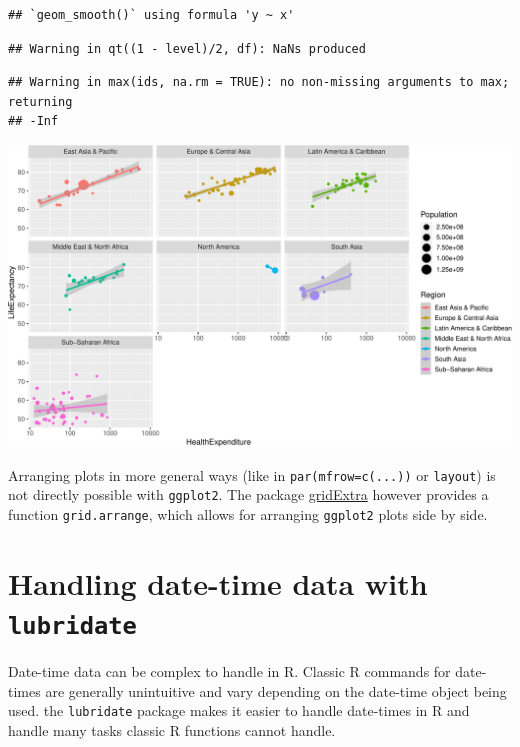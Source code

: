 \documentclass[
]{book}
\begin{document}
\begin{verbatim}
## `geom_smooth()` using formula 'y ~ x'
\end{verbatim}

\begin{verbatim}
## Warning in qt((1 - level)/2, df): NaNs produced
\end{verbatim}

\begin{verbatim}
## Warning in max(ids, na.rm = TRUE): no non-missing arguments to max; returning
## -Inf
\end{verbatim}

\includegraphics[width=\textwidth]{bookdown-demo_files/figure-latex/unnamed-chunk-65-1}

Arranging plots in more general ways (like in \texttt{par(mfrow=c(...))} or \texttt{layout}) is not directly possible with \texttt{ggplot2}. The package \href{https://cran.r-project.org/web/packages/gridExtra}{gridExtra} however provides a function \texttt{grid.arrange}, which allows for arranging \texttt{ggplot2} plots side by side.

\hypertarget{handling-date-time-data-with-lubridate}{%
\chapter{\texorpdfstring{Handling date-time data with \texttt{lubridate}}{Handling date-time data with lubridate}}\label{handling-date-time-data-with-lubridate}}

Date-time data can be complex to handle in R. Classic R commands for date-times are generally unintuitive and vary depending on the date-time object being used. the \texttt{lubridate} package makes it easier to handle date-times in R and handle many tasks classic R functions cannot handle.
\end{document}

